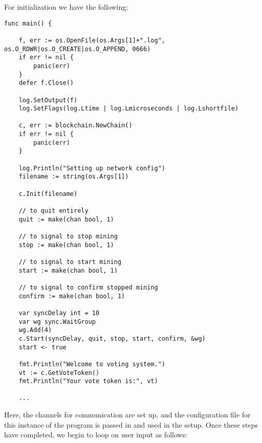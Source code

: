 \documentclass[a4paper,12pt]{article}
\begin{document}
For initialization we have the following:
\begin{Verbatim}[obeytabs,tabsize=4]
func main() {

	f, err := os.OpenFile(os.Args[1]+".log", os.O_RDWR|os.O_CREATE|os.O_APPEND, 0666)
	if err != nil {
		panic(err)
	}
	defer f.Close()

	log.SetOutput(f)
	log.SetFlags(log.Ltime | log.Lmicroseconds | log.Lshortfile)

	c, err := blockchain.NewChain()
	if err != nil {
		panic(err)
	}

	log.Println("Setting up network config")
	filename := string(os.Args[1])

	c.Init(filename)

	// to quit entirely
	quit := make(chan bool, 1)

	// to signal to stop mining
	stop := make(chan bool, 1)

	// to signal to start mining
	start := make(chan bool, 1)

	// to signal to confirm stopped mining
	confirm := make(chan bool, 1)

	var syncDelay int = 10
	var wg sync.WaitGroup
	wg.Add(4)
	c.Start(syncDelay, quit, stop, start, confirm, &wg)
	start <- true

	fmt.Println("Welcome to voting system.")
	vt := c.GetVoteToken()
	fmt.Println("Your vote token is:", vt)

    ...

\end{Verbatim}
Here, the channels for communication are set up, and the configuration file for this instance of the program is passed in and used in the setup. Once these steps have completed, we begin to loop on user input as follows:
\end{document}
